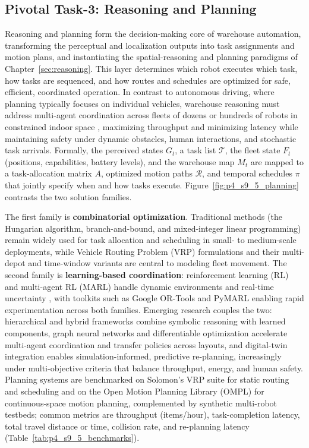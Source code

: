 \subsection{Pivotal Task-3: Reasoning and Planning}
\label{subsec:p4-sec9-5-pivotal-task-3-reasoning-and-planning}
Reasoning and planning form the decision-making core of warehouse automation, transforming the perceptual and localization outputs into task assignments and motion plans, and instantiating the spatial-reasoning and planning paradigms of Chapter~\ref{sec:reasoning}. 
This layer determines which robot executes which task, how tasks are sequenced, and how routes and schedules are optimized for safe, efficient, coordinated operation. 
In contrast to autonomous driving, where planning typically focuses on individual vehicles, warehouse reasoning must address multi-agent coordination across fleets of dozens or hundreds of robots in constrained indoor space \cite{Veloso2015CMUCoBot}, maximizing throughput and minimizing latency while maintaining safety under dynamic obstacles, human interactions, and stochastic task arrivals. 
Formally, the perceived states $G_t$, a task list $\mathcal{T}$, the fleet state $F_t$ (positions, capabilities, battery levels), and the warehouse map $M_t$ are mapped to a task-allocation matrix $A$, optimized motion paths $\mathcal{R}$, and temporal schedules $\pi$ that jointly specify when and how tasks execute. Figure~\ref{fig:p4_s9_5_planning} contrasts the two solution families.


The first family is \textbf{combinatorial optimization}. Traditional methods (the Hungarian algorithm, branch-and-bound, and mixed-integer linear programming) remain widely used for task allocation and scheduling in small- to medium-scale deployments, while Vehicle Routing Problem (VRP) formulations \cite{Cordeau2007VRP} and their multi-depot and time-window variants are central to modeling fleet movement. The second family is \textbf{learning-based coordination}: reinforcement learning (RL) and multi-agent RL (MARL) handle dynamic environments and real-time uncertainty \cite{Sartoretti2019PRIMAL,samvelyan2019smac}, with toolkits such as Google OR-Tools \cite{Perron2019ORTools} and PyMARL enabling rapid experimentation across both families. 
Emerging research couples the two: hierarchical and hybrid frameworks combine symbolic reasoning with learned components, graph neural networks and differentiable optimization accelerate multi-agent coordination and transfer policies across layouts, and digital-twin integration enables simulation-informed, predictive re-planning, increasingly under multi-objective criteria that balance throughput, energy, and human safety. 
Planning systems are benchmarked on Solomon's VRP suite \cite{Solomon1987VRP} for static routing and scheduling and on the Open Motion Planning Library (OMPL) \cite{Sucan2012OMPL} for continuous-space motion planning, complemented by synthetic multi-robot testbeds; common metrics are throughput (items/hour), task-completion latency, total travel distance or time, collision rate, and re-planning latency (Table~\ref{tab:p4_s9_5_benchmarks}).


